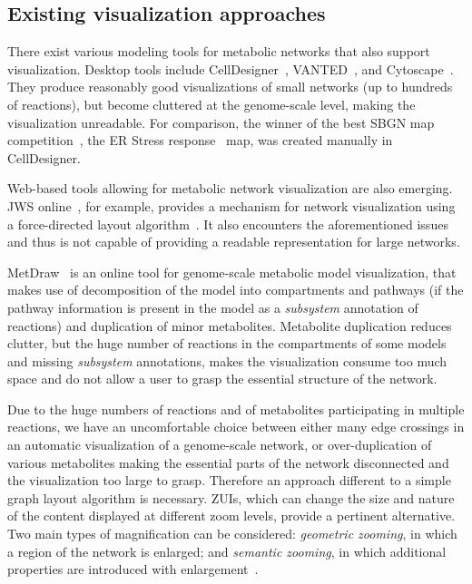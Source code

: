 \documentclass{bmcart}
\begin{document}
\subsection*{Existing visualization approaches}
There exist various modeling tools for metabolic networks that also support visualization. Desktop tools include CellDesigner~\cite{Funahashi2008}, VANTED~\cite{Rohn2012}, and Cytoscape~\cite{Smoot2011}. They produce reasonably good visualizations of small networks (up to hundreds of reactions), but become cluttered at the genome-scale level, making the visualization unreadable. For comparison, the winner of the best SBGN map competition~\cite{SBGN}, the ER Stress response~\cite{Groenendyk2010} map,  was created manually in CellDesigner.

Web-based tools allowing for metabolic network visualization are also emerging.  JWS online~\cite{Snoep2003}, for example, provides a mechanism for network visualization using a force-directed layout algorithm~\cite{Fruchterman1991, Tamassia:2007:HGD:1202383}. It also encounters the aforementioned issues and thus is not capable of providing a readable representation for large networks.  

MetDraw~\cite{Jensen2014} is an online tool for genome-scale metabolic model visualization, that makes use of decomposition of the model into compartments and pathways (if the pathway information is present in the model as a \emph{subsystem} annotation of reactions) and duplication of minor metabolites. Metabolite duplication reduces clutter, but the huge number of reactions in the compartments of some models and missing \emph{subsystem} annotations, makes the visualization consume too much space and do not allow a user to grasp the essential structure of the network.

Due to the huge numbers of reactions and of metabolites participating in multiple reactions, we have an uncomfortable choice between either many edge crossings in an automatic visualization of a genome-scale network, or over-duplication of various metabolites making the essential parts of the network disconnected and the visualization too large to grasp. Therefore an approach different to a simple graph layout algorithm is necessary. ZUIs, which can change the size and nature of the content displayed at different zoom levels, provide a pertinent alternative. Two main types of magnification can be considered: \emph{geometric zooming}, in which a region of the network is enlarged; and \emph{semantic zooming}, in which additional properties are introduced with enlargement~\cite{Hu2007}.
\end{document}
